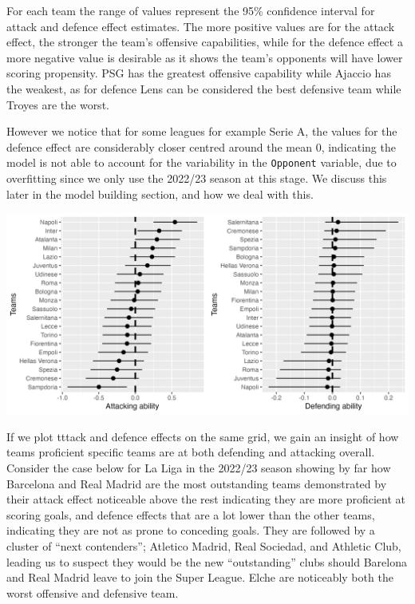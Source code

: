 \documentclass[
]{article}
\begin{document}
For each team the range of values represent the 95\% confidence interval
for attack and defence effect estimates. The more positive values are
for the attack effect, the stronger the team's offensive capabilities,
while for the defence effect a more negative value is desirable as it
shows the team's opponents will have lower scoring propensity. PSG has
the greatest offensive capability while Ajaccio has the weakest, as for
defence Lens can be considered the best defensive team while Troyes are
the worst.

However we notice that for some leagues for example Serie A, the values
for the defence effect are considerably closer centred around the mean
0, indicating the model is not able to account for the variability in
the \texttt{Opponent} variable, due to overfitting since we only use the
2022/23 season at this stage. We discuss this later in the model
building section, and how we deal with this.

\begin{center}\includegraphics[width=0.7\linewidth]{saattdef} \end{center}

If we plot tttack and defence effects on the same grid, we gain an
insight of how teams proficient specific teams are at both defending and
attacking overall. Consider the case below for La Liga in the 2022/23
season showing by far how Barcelona and Real Madrid are the most
outstanding teams demonstrated by their attack effect noticeable above
the rest indicating they are more proficient at scoring goals, and
defence effects that are a lot lower than the other teams, indicating
they are not as prone to conceding goals. They are followed by a cluster
of ``next contenders''; Atletico Madrid, Real Sociedad, and Athletic
Club, leading us to suspect they would be the new ``outstanding'' clubs
should Barelona and Real Madrid leave to join the Super League. Elche
are noticeably both the worst offensive and defensive team.
\end{document}
